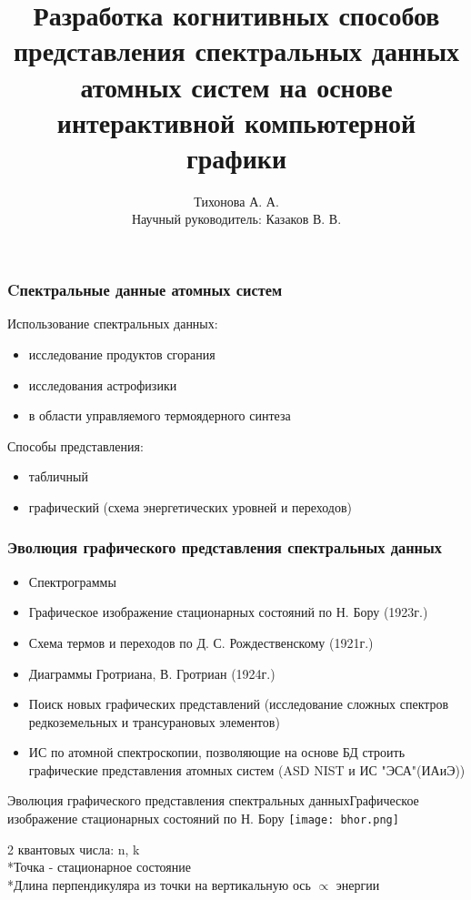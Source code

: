 \documentclass{beamer}
\title{Разработка когнитивных способов представления спектральных данных атомных систем на основе интерактивной компьютерной графики}
\author{Тихонова А. А. \\
        Научный руководитель: Казаков В. В.}
\institute{Новосибирский Государственный Университет}
\begin{document}
\begin{frame}
\titlepage
\end{frame}

\begin{frame}
\frametitle{Cпектральные данные атомных систем}
    Использование спектральных данных:
    \begin{itemize}
        \item исследование продуктов сгорания
        \item исследования астрофизики
        \item в области управляемого термоядерного синтеза
    \end{itemize}
    Способы представления:
    \begin{itemize}
        \item табличный
        \item графический (схема энергетических уровней и переходов)
    \end{itemize}
\end{frame}

\begin{frame}
\frametitle{Эволюция графического представления спектральных данных}
    \begin{itemize}
        \item Спектрограммы
        \item Графическое изображение стационарных состояний по Н. Бору (1923г.)
        \item Схема термов и переходов по Д. С. Рождественскому (1921г.)
        \item Диаграммы Гротриана, В. Гротриан (1924г.)
        \item Поиск новых графических представлений (исследование сложных спектров редкоземельных и трансурановых элементов)
        \item ИС по атомной спектроскопии, позволяющие на основе БД строить графические представления атомных систем (ASD NIST и ИС "ЭСА"(ИАиЭ))
    \end{itemize}
\end{frame}

\begin{frame}{Эволюция графического представления спектральных данных}{Графическое изображение стационарных состояний по Н. Бору}
    \texttt{[image: bhor.png]}
    \begin{block}{}
         2 квантовых числа: n, k
         \\*Точка - стационарное состояние
         \\*Длина перпендикуляра из точки на вертикальную ось  $\propto$ энергии
    \end{block}
     
  
\end{frame}
\end{document}
